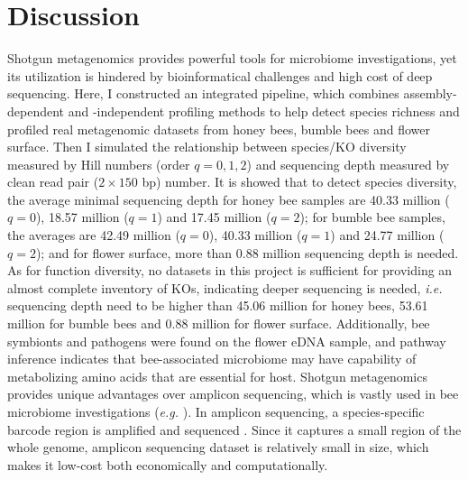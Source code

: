 \documentclass[11pt]{article}
\begin{document}
\section{Discussion}
Shotgun metagenomics provides powerful tools for microbiome investigations, yet its utilization is hindered by bioinformatical challenges and high cost of deep sequencing. 
Here, I constructed an integrated pipeline, which combines assembly-dependent and -independent profiling methods to help detect species richness and profiled real metagenomic datasets from honey bees, bumble bees and flower surface.  
Then I simulated the relationship between species/KO diversity measured by Hill numbers (order $q = 0, 1, 2$) and sequencing depth measured by clean read pair ($2 \times 150$ bp) number. 
It is showed that to detect species diversity, the average minimal sequencing depth for honey bee samples are 40.33 million ($q = 0$), 18.57 million ($q = 1$) and 17.45 million ($q = 2$); for bumble bee samples, the averages are 42.49 million ($q = 0$), 40.33 million ($q = 1$) and 24.77 million ($q = 2$); and for flower surface, more than 0.88 million sequencing depth is needed. 
As for function diversity, no datasets in this project is sufficient for providing an almost complete inventory of KOs, indicating deeper sequencing is needed, \textit{i.e.} sequencing depth need to be higher than 45.06 million for honey bees, 53.61 million for bumble bees and 0.88 million for flower surface. 
Additionally, bee symbionts and pathogens were found on the flower eDNA sample, and pathway inference indicates that bee-associated microbiome may have capability of metabolizing amino acids that are essential for host.
\newline
Shotgun metagenomics provides unique advantages over amplicon sequencing, which is vastly used in bee microbiome investigations (\textit{e.g.} \cite{geldert2021dietary,wang2021gut,powell9field,kapheim2021composition}). 
In amplicon sequencing, a species-specific barcode region is amplified and sequenced \citep{abdelfattah2018metabarcoding}. 
Since it captures a small region of the whole genome, amplicon sequencing dataset is relatively small in size, which makes it low-cost both economically and computationally. 
\end{document}
